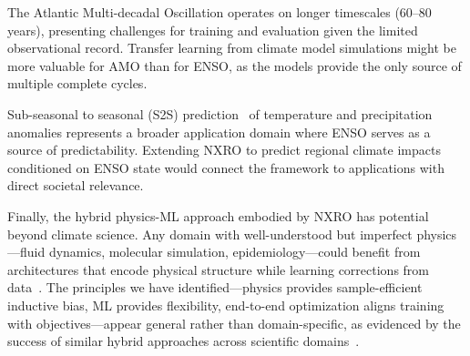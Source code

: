 The Atlantic Multi-decadal Oscillation operates on longer timescales (60--80 years), presenting challenges for training and evaluation given the limited observational record. Transfer learning from climate model simulations might be more valuable for AMO than for ENSO, as the models provide the only source of multiple complete cycles.

Sub-seasonal to seasonal (S2S) prediction~\cite{vitart2017subseasonal} of temperature and precipitation anomalies represents a broader application domain where ENSO serves as a source of predictability. Extending NXRO to predict regional climate impacts conditioned on ENSO state would connect the framework to applications with direct societal relevance.

Finally, the hybrid physics-ML approach embodied by NXRO has potential beyond climate science. Any domain with well-understood but imperfect physics---fluid dynamics, molecular simulation, epidemiology---could benefit from architectures that encode physical structure while learning corrections from data~\cite{daw2022physics,beucler2021enforcing}. The principles we have identified---physics provides sample-efficient inductive bias, ML provides flexibility, end-to-end optimization aligns training with objectives---appear general rather than domain-specific, as evidenced by the success of similar hybrid approaches across scientific domains~\cite{willard2022integrating,yin2021augmenting}.
